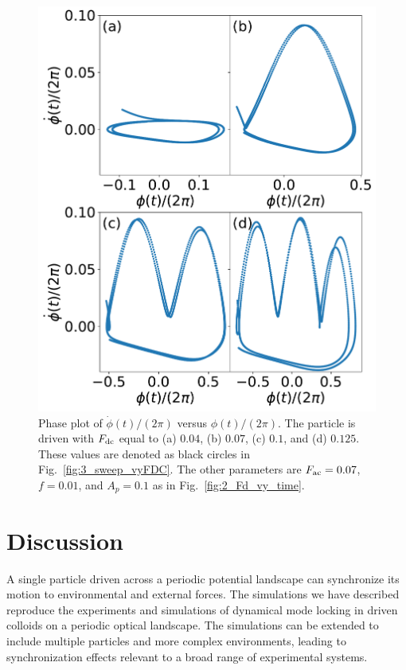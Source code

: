 \documentclass[preprint,showpacs,preprintnumbers,amsmath,amssymb,aps,prb]{revtex4-1}
\theoremstyle{remark}
\begin{document}
    \begin{figure}[h!]
      \centering
      \includegraphics[width=\columnwidth]{fig4_phase.pdf}
      \caption{
        Phase plot of $\dot{\phi}(t)/(2\pi)$ versus $\phi(t)/(2\pi)$.
        The particle is driven with $F_{\rm dc}$ equal to  (a) $0.04$, (b) $0.07$, (c) $0.1$, and (d) $0.125$.  These values are denoted as black circles
        in Fig.~\ref{fig:3_sweep_vyFDC}. 
      The other parameters
      are $F_{\rm ac} = 0.07$, $f=0.01$, and $A_p = 0.1$
      as in Fig.~\ref{fig:2_Fd_vy_time}.}
      \label{fig:4_phase}
    \end{figure}

\section{Discussion} %
\label{sec:conclusion}	

A single particle driven across a periodic potential landscape 
can synchronize its motion 
to environmental and external forces. 
The simulations we have described 
reproduce the experiments and simulations 
of dynamical 
mode locking in
driven colloids on a
periodic optical landscape.\cite{Juniper2015, Juniper2017}
The simulations can be extended
to include multiple particles
and more complex environments,
leading to
synchronization effects relevant 
to a broad range of experimental systems.
\end{document}
